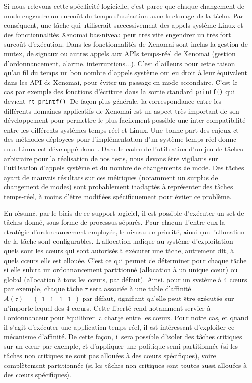 \documentclass[french, a4paper, 11pt, twoside, pdftex]{StyleThese}
\begin{document}
		Si nous relevons cette spécificité logicielle, c'est parce que chaque changement de mode engendre un surcoût de temps d'exécution avec le clonage de la tâche. Par conséquent, une tâche qui utiliserait successivement des appels système Linux et des fonctionnalités Xenomai bas-niveau peut très vite engendrer un très fort surcoût d'exécution. Dans les fonctionnalités de Xenomai sont inclus la gestion de mutex, de signaux ou autres appels aux APIs temps-réel de Xenomai (gestion d'ordonnancement, alarme, interruptions...). C'est d'ailleurs pour cette raison qu'au fil du temps un bon nombre d'appels système ont eu droit à leur équivalent dans les API de Xenomai, pour éviter un passage en mode secondaire. C'est le cas par exemple des fonctions d'écriture dans la sortie standard \texttt{printf()} qui devient \texttt{rt\_printf()}. De façon plus générale, la correspondance entre les différents domaines applicatifs de Xenomai est un aspect très important de son développement pour permettre le plus facilement possible une inter-compatibilité entre les différents systèmes temps-réel et Linux. Une bonne part des enjeux et des méthodes déployées pour l'implémentation d'un système temps-réel donné sous Linux est développé dans~\cite{gerum_xenomai_2015}. 
	    Dans le cadre de l'utilisation d'un jeu de tâches arbitraire pour la réalisation de nos tests, nous devons être vigilants sur l'utilisation d'appels système et du nombre de changements de mode. Des tâches ayant de mauvais résultats sur ces métriques (notamment un surplus de changement de modes) sont probablement inadaptés à représenter des tâches temps-réel, à moins d'être modifiées spécifiquement pour éviter ce problème. 

		\smallbreak
        En résumé, par le biais de ce support logiciel, il est possible d'exécuter un set de tâches donné, sous forme de processus séparés. Pour chacun d'entre eux la stratégie d'ordonnancement employée, le niveau de priorité, ainsi que l'allocation de la tâche sont configurables. L'allocation indique au système d'exploitation quels sont les cœurs qui sont autorisés à exécuter une tâche, autrement dit, à quels cœurs elle est allouée. C'est ce qui permet de déterminer pour chaque tâche si elle subira un ordonnancement partitionné (allocation à un unique cœur) ou global (allocation à tous les cœurs, par défaut).  Ainsi, pour un système à 4 cœurs par exemple, chaque tâche $\tau$ sera associée à une table d'affinité $A(\tau) = \begin{pmatrix}1 & 1 & 1 & 1\end{pmatrix}$ par défaut, signifiant qu'elle peut être exécutée sur n'importe lequel des 4 cœurs. Cette liberté rend notamment service à l'ordonnanceur pour équilibrer la charge entre les cœurs. Pour notre cas, et quand il s'agit d'exécuter une application temps-réel, il est intéressant d'exploiter ce mécanisme d'affinité. De cette façon, il sera possible d'isoler des tâches critiques sur un cœur par exemple, et d'appliquer une politique semi-partitionnée (si les tâches non critiques ne sont pas allouées à des cœurs spécifiques), voire complètement partitionnée (si les tâches non critiques sont toutes aussi allouées à des cœurs spécifiques).
        
\end{document}

